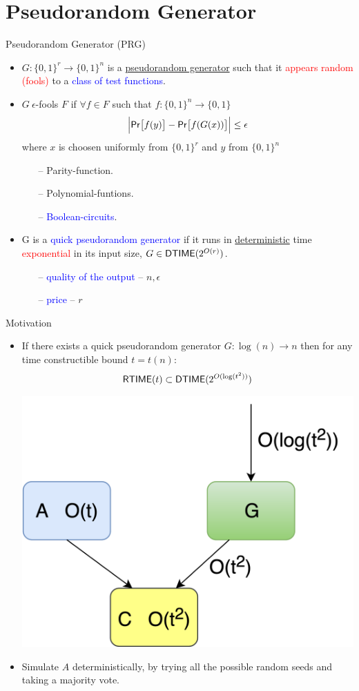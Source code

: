 \documentclass[xcolor={table,dvipsnames,usenames}]{beamer}
\begin{document}
\section{Pseudorandom Generator}
\begin{frame}{Pseudorandom Generator (PRG)}
\begin{itemize}
	\item $G: \{0,1\}^r \rightarrow \{0,1\}^n$ is a {\underline{pseudorandom generator}} such that it \textcolor{red}{appears random (fools)} to a \textcolor{blue}{class of test functions}.
	\pause
	\item $G~\epsilon$-fools $F$ if $\forall f \in F$ such that $f: \{0,1\}^n \rightarrow \{0,1\}$
	$$\Big|\mathsf{Pr}\big[f(y)\big] -  \mathsf{Pr}\big[f(G(x))\big]\Big| \leq \epsilon$$
	where $x$ is choosen uniformly from $\{0,1\}^r$ and $y$ from $\{0,1\}^n$
	\pause
	\begin{itemize}
		\item[--] Parity-function.
		\item[--] Polynomial-funtions.
		\item[--] \textcolor{blue}{Boolean-circuits}.
	\end{itemize}
	\pause
	\item G is a \textcolor{blue}{quick pseudorandom generator} if it runs in \underline{deterministic} time \textcolor{red}{exponential} in its input size, $G \in \mathsf{DTIME} (2^{O(r)})$.
	\begin{itemize}
		\item[--] \textcolor{blue}{quality of the output} -- $n,\epsilon$
		\item[--] \textcolor{blue}{price} -- $r$
	\end{itemize}
\end{itemize}
\end{frame}
\begin{frame}{Motivation}
\begin{itemize}
	\item If there exists a quick pseudorandom generator $G: \log(n) \rightarrow n$ then for any time constructible bound $t=t(n):$ $$\mathsf{RTIME}(t) \subset \mathsf{DTIME}(2^{O(\log(t^2))})$$
	\pause
	\begin{center}
			        \includegraphics[width=0.4\columnwidth]{figures/RandomSimulation}
	\end{center}
\pause
\item  Simulate $A$ deterministically, by trying all the possible random seeds and taking a majority vote. 
\end{itemize}
\end{frame}
\end{document}
